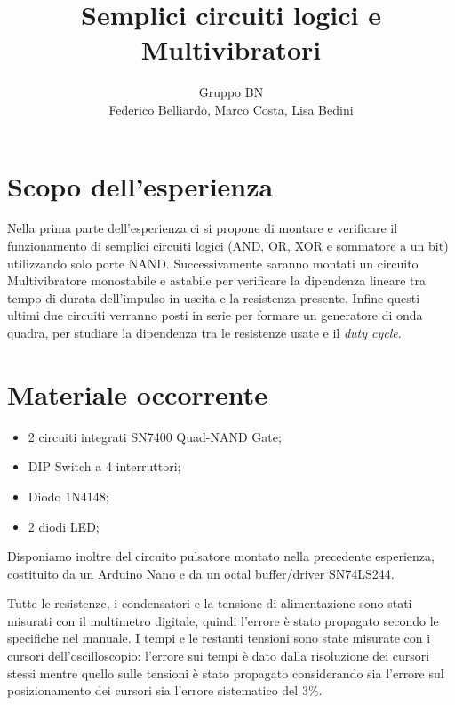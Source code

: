 \documentclass[10pt,a4paper]{article}
\author{Gruppo BN \\ Federico Belliardo, Marco Costa, Lisa Bedini}
\title{Semplici circuiti logici e Multivibratori}
\begin{document}
\maketitle
\section{Scopo dell'esperienza}
Nella prima parte dell'esperienza ci si propone di montare e verificare il funzionamento di semplici circuiti logici (AND, OR, XOR e sommatore a un bit) utilizzando solo porte NAND. Successivamente saranno montati un circuito Multivibratore monostabile e astabile per verificare la dipendenza lineare tra tempo di durata dell'impulso in uscita e la resistenza presente. Infine questi ultimi due circuiti verranno posti in serie per formare un generatore di onda quadra, per studiare la dipendenza tra le resistenze usate e il \emph{duty cycle}.\\

\section{Materiale occorrente}
\begin{itemize}
\item 2 circuiti integrati SN7400 Quad-NAND Gate;
\item DIP Switch a 4 interruttori;
\item Diodo 1N4148;
\item 2 diodi LED;
\end{itemize}
Disponiamo inoltre del circuito pulsatore montato nella precedente esperienza, costituito da un Arduino Nano e da un octal buffer/driver SN74LS244.

Tutte le resistenze, i condensatori e la tensione di alimentazione sono stati misurati con il multimetro digitale, quindi l'errore è stato propagato secondo le specifiche nel manuale. I tempi e le restanti tensioni sono state misurate con i cursori dell'oscilloscopio: l'errore sui tempi è dato dalla risoluzione dei cursori stessi mentre quello sulle tensioni è stato propagato considerando sia l'errore sul posizionamento dei cursori sia l'errore sistematico del $3\%$.
\end{document}
